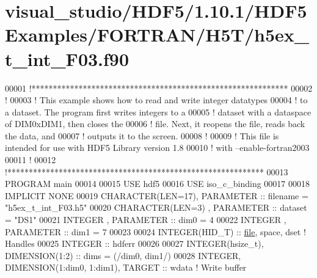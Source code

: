 \hypertarget{visual__studio_2_h_d_f5_21_810_81_2_h_d_f5_examples_2_f_o_r_t_r_a_n_2_h5_t_2h5ex__t__int___f03_8f90_source}{}\section{visual\+\_\+studio/\+H\+D\+F5/1.10.1/\+H\+D\+F5\+Examples/\+F\+O\+R\+T\+R\+A\+N/\+H5\+T/h5ex\+\_\+t\+\_\+int\+\_\+\+F03.f90}
\label{visual__studio_2_h_d_f5_21_810_81_2_h_d_f5_examples_2_f_o_r_t_r_a_n_2_h5_t_2h5ex__t__int___f03_8f90_source}

\begin{DoxyCode}
00001 \textcolor{comment}{!************************************************************}
00002 \textcolor{comment}{!}
00003 \textcolor{comment}{!  This example shows how to read and write integer datatypes}
00004 \textcolor{comment}{!  to a dataset.  The program first writes integers to a}
00005 \textcolor{comment}{!  dataset with a dataspace of DIM0xDIM1, then closes the}
00006 \textcolor{comment}{!  file.  Next, it reopens the file, reads back the data, and}
00007 \textcolor{comment}{!  outputs it to the screen.}
00008 \textcolor{comment}{!}
00009 \textcolor{comment}{!  This file is intended for use with HDF5 Library version 1.8}
00010 \textcolor{comment}{!  with --enable-fortran2003}
00011 \textcolor{comment}{!}
00012 \textcolor{comment}{!************************************************************}
00013 \textcolor{keyword}{PROGRAM} main
00014 
00015   \textcolor{keywordtype}{USE }hdf5
00016   \textcolor{keywordtype}{USE }iso\_c\_binding
00017 
00018   \textcolor{keywordtype}{IMPLICIT NONE}
00019   \textcolor{keywordtype}{CHARACTER(LEN=17)}, \textcolor{keywordtype}{PARAMETER} :: filename  = \textcolor{stringliteral}{"h5ex\_t\_int\_F03.h5"}
00020   \textcolor{keywordtype}{CHARACTER(LEN=3)} , \textcolor{keywordtype}{PARAMETER} :: dataset   = \textcolor{stringliteral}{"DS1"}
00021   \textcolor{keywordtype}{INTEGER}          , \textcolor{keywordtype}{PARAMETER} :: dim0      = 4
00022   \textcolor{keywordtype}{INTEGER}          , \textcolor{keywordtype}{PARAMETER} :: dim1      = 7
00023 
00024   \textcolor{keywordtype}{INTEGER(HID\_T)}  :: \hyperlink{structfile}{file}, space, dset \textcolor{comment}{! Handles}
00025   \textcolor{keywordtype}{INTEGER} :: hdferr
00026 
00027   \textcolor{keywordtype}{INTEGER(hsize\_t)},   \textcolor{keywordtype}{DIMENSION(1:2)} :: dims = (/dim0, dim1/)
00028   \textcolor{keywordtype}{INTEGER}, \textcolor{keywordtype}{DIMENSION(1:dim0, 1:dim1)}, \textcolor{keywordtype}{TARGET} :: wdata \textcolor{comment}{! Write buffer}

\end{DoxyCode}
